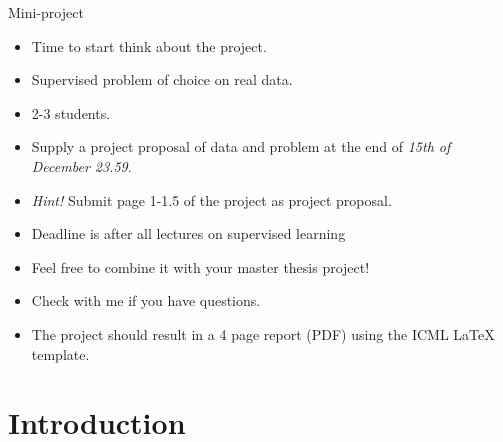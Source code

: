 \documentclass[10pt]{beamer}
\begin{document}
\begin{frame}{Mini-project}

\begin{itemize}
\item Time to start think about the project.\pause
\item {\color{uured} Supervised} problem of choice on {\color{uured} real data}.\pause
\item 2-3 students.\pause
\item Supply a {\color{uured} project proposal} of data and problem at the end of \emph{15th of December 23.59}.
\item \emph{Hint!} Submit page 1-1.5 of the project as project proposal.
\item Deadline is after all lectures on supervised learning\pause
\item Feel free to combine it with your master thesis project!\pause
\item Check with me if you have questions.
\item The project should result in a 4 page report (PDF) using the {\color{uured} ICML LaTeX template}.
\end{itemize}
\end{frame}


\section{Introduction}
\frame{\sectionpage}

\end{document}
